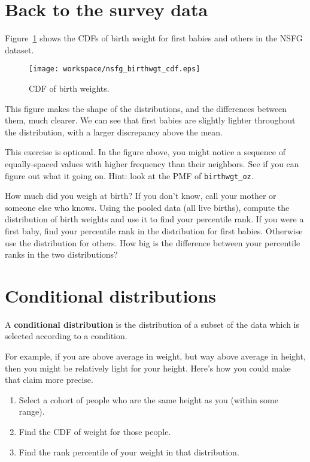 \documentclass[10pt]{book}
\begin{document}
\section{Back to the survey data}

Figure~\ref{nsfg_birthwgt_cdf} shows the CDFs of birth weight for
first babies and others in the NSFG dataset.

\begin{figure}
\centerline{\texttt{[image: workspace/nsfg\_birthwgt\_cdf.eps]}}
\caption{CDF of birth weights.}
\label{nsfg_birthwgt_cdf}
\end{figure}

This figure makes the shape of the distributions, and the differences
between them, much clearer.  We can see that first babies are slightly
lighter throughout the distribution, with a larger discrepancy above 
the mean.

\begin{ex}
This exercise is optional.  In the figure above, you might notice
a sequence of equally-spaced values with higher frequency than
their neighbors.  See if you can figure out what it going on.
Hint: look at the PMF of \verb"birthwgt_oz".
\end{ex}

\begin{ex}
How much did you weigh at birth?  If you don't know, call your mother
or someone else who knows.  Using the pooled data (all live births),
compute the distribution of birth weights and use it to find your
percentile rank.  If you were a first baby, find your percentile rank
in the distribution for first babies.  Otherwise use the distribution
for others.  How big is the difference between your percentile ranks
in the two distributions?
\end{ex}


\section{Conditional distributions}

A {\bf conditional distribution} is the distribution of a subset of
the data which is selected according to a condition.

For example, if you are above average in weight, but way above average
in height, then you might be relatively light for your height.  Here's
how you could make that claim more precise.

\begin{enumerate}

\item Select a cohort of people who are the same height as you (within
some range).

\item Find the CDF of weight for those people.

\item Find the rank percentile of your weight in that distribution.

\end{enumerate}
\end{document}

